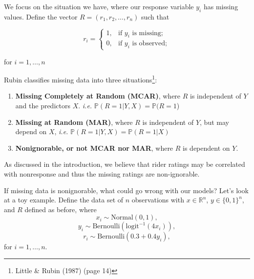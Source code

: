 \documentclass[12pt,twoside]{reedthesis}
\providecommand{\tightlist}{%
  \setlength{\itemsep}{0pt}\setlength{\parskip}{0pt}}
\begin{document}
  We focus on the situation we have, where our response variable \(y_i\)
  has missing values. Define the vector \(R = (r_1, r_2, \ldots, r_n)\)
  such that
  
  \begin{equation}
  r_i = \left\{ \begin{array}{ll}
  1, & \text{if } y_i \text{ is missing};\\
  0, & \text{if } y_i \text{ is observed};
  \end{array}
  \right.
  \end{equation}
  
  for \(i = 1,\ldots, n\)
  
  Rubin classifies missing data into three situations\footnote{Little \&
    Rubin (1987) (page 14)}:
  
  \begin{enumerate}
  \def\labelenumi{\arabic{enumi}.}
  \tightlist
  \item
    \textbf{Missing Completely at Random (MCAR)}, where \(R\) is
    independent of \(Y\) and the predictors \(X\). \emph{i.e.}
    \(\mathbb{P} (R = 1| Y, X) = \mathbb{P}(R = 1\))
  \item
    \textbf{Missing at Random (MAR)}, where \(R\) is independent of \(Y\),
    but may depend on \(X\), \emph{i.e.}
    \(\mathbb{P} (R = 1 |Y, X) = \mathbb{P} (R = 1 | X )\)
  \item
    \textbf{Nonignorable, or not MCAR nor MAR}, where \(R\) is dependent
    on \(Y\).
  \end{enumerate}
  
  As discussed in the introduction, we believe that rider ratings may be
  correlated with nonresponse and thus the missing ratings are
  non-ignorable.
  
  If missing data is nonignorable, what could go wrong with our models?
  Let's look at a toy example. Define the data set of \(n\) observations
  with \(x \in \mathbb{R}^n\), \(y \in \{0,1\}^n\), and \(R\) defined as
  before, where \[x_i \sim \text{Normal}(0,1),\]
  \[y_i \sim \text{Bernoulli}(\text{logit}^{-1} (4x_i)),\]
  \[r_i \sim \text{Bernoulli}(0.3 + 0.4 y_i),\] for \(i = 1, \ldots, n\).
  
\end{document}
